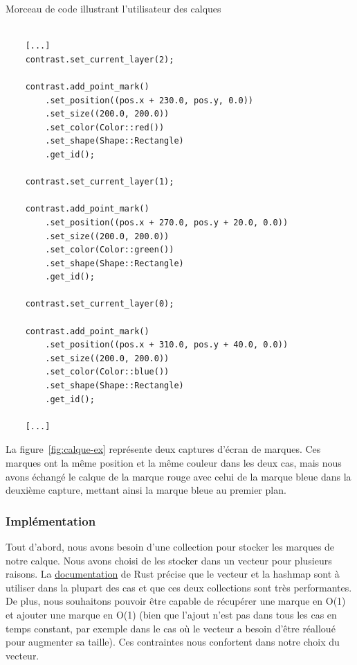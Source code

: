 \documentclass[12pt]{article}
\begin{document}
\begin{listing}[H]
    \caption{Morceau de code illustrant l'utilisateur des calques}
    \begin{verbatim}

    [...]
    contrast.set_current_layer(2);

    contrast.add_point_mark()
        .set_position((pos.x + 230.0, pos.y, 0.0))
        .set_size((200.0, 200.0))
        .set_color(Color::red())
        .set_shape(Shape::Rectangle)
        .get_id();

    contrast.set_current_layer(1);

    contrast.add_point_mark()
        .set_position((pos.x + 270.0, pos.y + 20.0, 0.0))
        .set_size((200.0, 200.0))
        .set_color(Color::green())
        .set_shape(Shape::Rectangle)
        .get_id();

    contrast.set_current_layer(0);

    contrast.add_point_mark()
        .set_position((pos.x + 310.0, pos.y + 40.0, 0.0))
        .set_size((200.0, 200.0))
        .set_color(Color::blue())
        .set_shape(Shape::Rectangle)
        .get_id();

    [...]
    \end{verbatim}
    \label{lst:code-calque}
\end{listing}

La figure~\ref{fig:calque-ex} représente deux captures d'écran de marques.
Ces marques ont la même position et la même couleur dans les deux cas, mais nous avons échangé le calque
de la marque rouge avec celui de la marque bleue dans la deuxième capture, mettant ainsi la marque bleue
au premier plan.

\subsubsection{Implémentation}

Tout d'abord, nous avons besoin d'une collection pour stocker les marques de notre calque.
Nous avons choisi de les stocker dans un vecteur pour plusieurs raisons.
La \href{https://doc.rust-lang.org/std/collections/index.html}{documentation} de Rust précise que le
vecteur et la hashmap sont à utiliser dans la plupart des cas et que ces deux collections sont très
performantes.
De plus, nous souhaitons pouvoir être capable de récupérer une marque en O(1) et ajouter une marque en
O(1) (bien que l'ajout n'est pas dans tous les cas en temps constant, par exemple dans le cas où le
vecteur a besoin d'être réalloué pour augmenter sa taille). Ces contraintes nous confortent dans notre
choix du vecteur.
\end{document}
